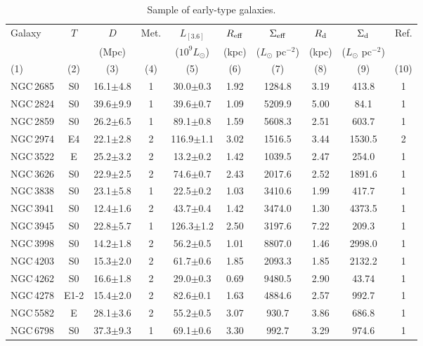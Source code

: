 \begin{table*}
\begin{center}
\caption{Sample of early-type galaxies.}
\setlength{\tabcolsep}{4pt}
\begin{tabular}{lccccccccc}
\hline
\hline
Galaxy    & $T$ & $D$  & Met. & $L_{[3.6]}$          & $R_{\rm eff}$ & $\Sigma_{\rm eff}$     & $R_{\rm d}$ & $\Sigma_{\rm d}$ & Ref. \\
          &     & (Mpc)&      & ($10^{9} L_{\odot}$) & (kpc)         & ($L_{\odot}$ pc$^{-2}$)& (kpc)       & ($L_{\odot}$ pc$^{-2}$) &\\
(1)       & (2) & (3)  & (4)  & (5)                  & (6)           & (7)                    & (8)         & (9) & (10)\\
\hline
NGC\,2685 & S0 & 16.1$\pm$4.8 & 1 & 30.0$\pm$0.3 & 1.92 & 1284.8 & 3.19 &  413.8 & 1\\
NGC\,2824 & S0 & 39.6$\pm$9.9 & 1 & 39.6$\pm$0.7 & 1.09 & 5209.9 & 5.00 &   84.1 & 1\\
NGC\,2859 & S0 & 26.2$\pm$6.5 & 1 & 89.1$\pm$0.8 & 1.59 & 5608.3 & 2.51 &  603.7 & 1\\
NGC\,2974 & E4 & 22.1$\pm$2.8 & 2 & 116.9$\pm$1.1& 3.02 & 1516.5 & 3.44 & 1530.5 & 2\\
NGC\,3522 & E  & 25.2$\pm$3.2 & 2 & 13.2$\pm$0.2 & 1.42 & 1039.5 & 2.47 &  254.0 & 1\\
NGC\,3626 & S0 & 22.9$\pm$2.5 & 2 & 74.6$\pm$0.7 & 2.43 & 2017.6 & 2.52 & 1891.6 & 1\\
NGC\,3838 & S0 & 23.1$\pm$5.8 & 1 & 22.5$\pm$0.2 & 1.03 & 3410.6 & 1.99 &  417.7 & 1\\
NGC\,3941 & S0 & 12.4$\pm$1.6 & 2 & 43.7$\pm$0.4 & 1.42 & 3474.0 & 1.30 & 4373.5 & 1\\
NGC\,3945 & S0 & 22.8$\pm$5.7 & 1 & 126.3$\pm$1.2& 2.50 & 3197.6 & 7.22 &  209.3 & 1\\
NGC\,3998 & S0 & 14.2$\pm$1.8 & 2 & 56.2$\pm$0.5 & 1.01 & 8807.0 & 1.46 & 2998.0 & 1\\
NGC\,4203 & S0 & 15.3$\pm$2.0 & 2 & 61.7$\pm$0.6 & 1.85 & 2093.3 & 1.85 & 2132.2 & 1\\
NGC\,4262 & S0 & 16.6$\pm$1.8 & 2 & 29.0$\pm$0.3 & 0.69 & 9480.5 & 2.90 & 43.74  & 1\\
NGC\,4278 &E1-2& 15.4$\pm$2.0 & 2 & 82.6$\pm$0.1 & 1.63 & 4884.6 & 2.57 &  992.7 & 1\\
NGC\,5582 & E  & 28.1$\pm$3.6 & 2 & 55.2$\pm$0.5 & 3.07 &  930.7 & 3.86 &  686.8 & 1\\
NGC\,6798 & S0 & 37.3$\pm$9.3 & 1 & 69.1$\pm$0.6 & 3.30 & 992.7  & 3.29 &  974.6 & 1\\

\end{tabular}
\end{center}
\end{table*}
